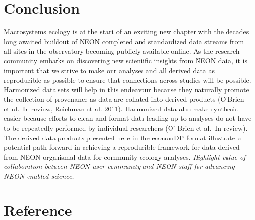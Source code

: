 \documentclass[
  12pt,
]{article}
\begin{document}
\hypertarget{conclusion}{%
\section{Conclusion}\label{conclusion}}

Macrosystems ecology is at the start of an exciting new chapter with the decades long awaited buildout of NEON completed and standardized data streams from all sites in the observatory becoming publicly available online. As the research community embarks on discovering new scientific insights from NEON data, it is important that we strive to make our analyses and all derived data as reproducible as possible to ensure that connections across studies will be possible. Harmonized data sets will help in this endeavour because they naturally promote the collection of provenance as data are collated into derived products (O'Brien et al.~In review, \protect\hyperlink{ref-reichman2011challenges}{Reichman et al. 2011}). Harmonized data also make synthesis easier because efforts to clean and format data leading up to analyses do not have to be repeatedly performed by individual researchers (O' Brien et al.~In review). The derived data products presented here in the ecocomDP format illustrate a potential path forward in achieving a reproducible framework for data derived from NEON organismal data for community ecology analyses. \emph{Highlight value of collaboration between NEON user community and NEON staff for advancing NEON enabled science.}

\hypertarget{reference}{%
\section*{Reference}\label{reference}}
\end{document}
